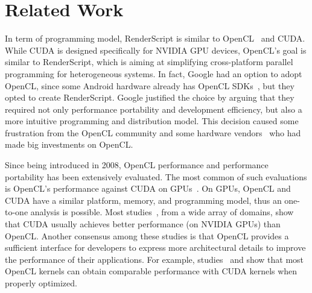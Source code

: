 \section{Related Work}
\label{sec:related}

In term of programming model, RenderScript is similar to OpenCL~\cite{OpenCL}
and CUDA. While CUDA is designed specifically for NVIDIA GPU devices, OpenCL's
goal is similar to RenderScript, which is aiming at simplifying cross-platform
parallel programming for heterogeneous systems.  In fact, Google had an option
to adopt OpenCL, since some Android hardware already has OpenCL
SDKs~\cite{OpenCL:Android}, but they opted to create RenderScript.  Google
justified the choice by arguing that they required not only performance
portability and development efficiency, but also a more intuitive programming
and distribution model.  This decision caused some frustration from the OpenCL
community \cite{androidblockopenCL} and some hardware
vendors~\cite{googlelockin} who had made big investments on OpenCL.

Since being introduced in 2008, OpenCL performance and performance portability
has been extensively evaluated.  The most common of such evaluations is OpenCL's
performance against CUDA on GPUs~\cite{fang2011comprehensive,
weber2011comparing, van2011correlating, vassilev2010comparison,
amorim2009comparing, karimi2010performance, komatsu2010evaluating}.  On
GPUs, OpenCL and CUDA have a similar platform, memory, and programming model,
thus an one-to-one analysis is possible.  Most studies~\cite{weber2011comparing,
van2011correlating, vassilev2010comparison, amorim2009comparing}, from a wide
array of domains, show that CUDA usually achieves better performance (on NVIDIA
GPUs) than OpenCL.  Another consensus among these studies is that OpenCL
provides a sufficient interface for developers to express more architectural
details to improve the performance of their applications.  For example,
studies~\cite{komatsu2010evaluating} and \cite{fang2011comprehensive} show that
most OpenCL kernels can obtain comparable performance with CUDA kernels when
properly optimized.

